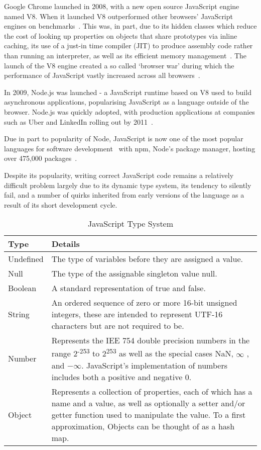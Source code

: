 \documentclass[]{final_report}
\begin{document}
Google Chrome launched in 2008, with a new open source JavaScript engine named V8. When it launched V8 outperformed other browsers' JavaScript engines on benchmarks~\cite{chromebenchmarks}. This was, in part, due to its hidden classes which reduce the cost of looking up properties on objects that share prototypes via inline caching, its use of a just-in time compiler (JIT) to produce assembly code rather than running an interpreter, as well as its efficient memory management~\cite{chromeengine, chromeengine2}. The launch of the V8 engine created a so called `browser war' during which the performance of JavaScript vastly increased across all browsers~\cite{knowyourenginesmozilla}.

In 2009, Node.js was launched - a JavaScript runtime based on V8 used to build asynchronous applications, popularising JavaScript as a language outside of the browser. Node.js was quickly adopted, with production applications at companies such as Uber and LinkedIn rolling out by 2011~\cite{linkedinusesnode, uberusesnode}. 

Due in part to popularity of Node, JavaScript is now one of the most popular languages for software development~\cite{stackoverflowsurvey, tiobeindex2017nov} with npm, Node's package manager, hosting over 475,000 packages~\cite{npm}.

Despite its popularity, writing correct JavaScript code remains a relatively difficult problem largely due to its dynamic type system, its tendency to silently fail, and a number of quirks inherited from early versions of the language as a result of its short development cycle.


\begin{table}[t]
\centering

\begin{tabular}{|p{2cm}|p{12cm}|}
\hline
Type & Details \\ \hline
Undefined & The type of variables before they are assigned a value. \\ \hline
Null & The type of the assignable singleton value null. \\ \hline
Boolean & A standard representation of true and false. \\ \hline
String & An ordered sequence of zero or more 16-bit unsigned integers, these are intended to represent UTF-16 characters but are not required to be. \\ \hline
Number & Represents the IEE 754 double precision numbers in the range 2\textsuperscript{-253} to 2\textsuperscript{253} as well as the special cases NaN, $\infty$ , and $ -\infty$. JavaScript's implementation of numbers includes both a positive and negative 0. \\ \hline
Object & Represents a collection of properties, each of which has a name and a value, as well as optionally a setter and/or getter function used to manipulate the value. To a first approximation, Objects can be thought of as a hash map. \\ \hline
\end{tabular}
\caption{JavaScript Type System}
\label{type-system}
\end{table}
\end{document}
